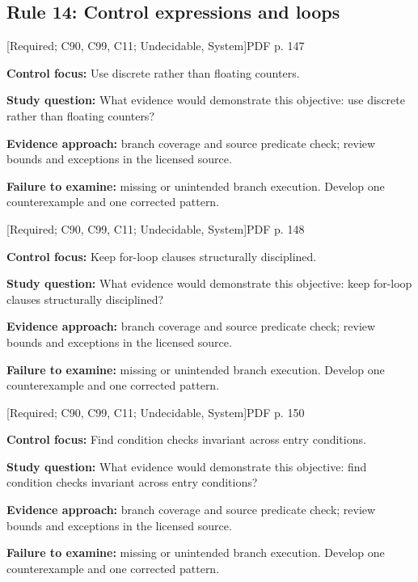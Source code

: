 \documentclass[10pt,letterpaper]{article}
\begin{document}
\subsection{Rule 14: Control expressions and loops}
 \textsf{\footnotesize [Required; C90, C99, C11; Undecidable, System]}\hfill{\footnotesize PDF p. 147}\par
\textbf{Control focus:} Use discrete rather than floating counters.\par
\textbf{Study question:} What evidence would demonstrate this objective: use discrete rather than floating counters?\par
\textbf{Evidence approach:} branch coverage and source predicate check; review bounds and exceptions in the licensed source.\par
\textbf{Failure to examine:} missing or unintended branch execution. Develop one counterexample and one corrected pattern.\par
\smallskip
{}
 \textsf{\footnotesize [Required; C90, C99, C11; Undecidable, System]}\hfill{\footnotesize PDF p. 148}\par
\textbf{Control focus:} Keep for-loop clauses structurally disciplined.\par
\textbf{Study question:} What evidence would demonstrate this objective: keep for-loop clauses structurally disciplined?\par
\textbf{Evidence approach:} branch coverage and source predicate check; review bounds and exceptions in the licensed source.\par
\textbf{Failure to examine:} missing or unintended branch execution. Develop one counterexample and one corrected pattern.\par
\smallskip
{}
 \textsf{\footnotesize [Required; C90, C99, C11; Undecidable, System]}\hfill{\footnotesize PDF p. 150}\par
\textbf{Control focus:} Find condition checks invariant across entry conditions.\par
\textbf{Study question:} What evidence would demonstrate this objective: find condition checks invariant across entry conditions?\par
\textbf{Evidence approach:} branch coverage and source predicate check; review bounds and exceptions in the licensed source.\par
\textbf{Failure to examine:} missing or unintended branch execution. Develop one counterexample and one corrected pattern.\par
\end{document}
